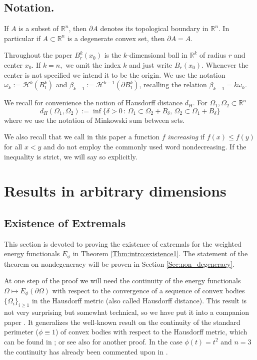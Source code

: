 \documentclass[10pt,leqno]{amsart}
\newcommand{\R}[0]{\mathbb{R}}
\newcommand{\p}{\partial}
\numberwithin{Theorem}{section}
\theoremstyle{definition}
\theoremstyle{remark}
\numberwithin{equation}{section}
\numberwithin{equation}{section}
\begin{document}
\subsection{Notation.}
If $A$ is a subset of $\R^n$, then $\p A$ denotes its topological boundary in $\R^n$. In particular if $A\subset\R^n$ is a degenerate convex set, then $\p A=A.$ 

Throughout the paper $B_r^k(x_0)$ is the $k$-dimensional ball in $\R^k$ of radius $r$ and center $x_0$. If $k=n,$ we omit the index $k$ and just write $B_r(x_0).$  Whenever the center is not specified we intend it to be the origin. We use the notation $\omega_{k}:=\mathcal{H}^{k}(B_1^k)$ and $\beta_{k-1}:=\mathcal{H}^{k-1}(\p B_1^k)$, recalling the relation $\beta_{k-1}= k \omega_k$. 

We recall for convenience the notion of Hausdorff distance $d_H$. 
For $\Omega_1,\Omega_2 \subset \R^n$
\[
d_H(\Omega_1,\Omega_2):= \inf \{\delta >0 \, : \, \Omega_1 \subset \Omega_2 + B_\delta, \, \Omega_2 \subset \Omega_1 + B_\delta \}
\]
where we use the notation of Minkowski sum between sets. 

We also recall that we call in this paper a function $f$ \textit{increasing} if $f(x)\leq f(y)$ for all $x<y$ and do not employ the commonly used word nondecreasing. If the inequality is strict, we will say so explicitly.   






\smallskip
\section{Results in arbitrary dimensions}

\subsection{Existence of Extremals} \label{Sec:existence}


This section is devoted to proving the existence of extremals for the weighted energy functionals $E_\phi$ in Theorem \ref{Thm:intro:existence1}. The statement of the theorem on nondegeneracy will be proven in Section \ref{Sec:non_degeneracy}.

At one step of the proof we will need the continuity of the energy functionals $\Omega\mapsto E_\phi(\p\Omega)$ with respect to the convergence of a sequence of convex bodies $\{\Omega_i\}_{i\geq1}$ in the  Hausdorff metric (also called Hausdorff distance). This result is not very surprising but somewhat technical, so we have put it into a companion paper \cite{CG_part2}.  
It generalizes the well-known result on the continuity of the standard perimeter ($\phi\equiv1$) of convex bodies with respect to the Hausdorff metric, which can be found in \cite[Result 3.2.36, p. 272]{federer}; or see also \cite[Section 2.3]{Bucur} for another proof. In the case $\phi(t)=t^2$ and $n=3$ the continuity has already been commented upon in \cite{FreitasLaugesenLiddell}.  
\end{document}
